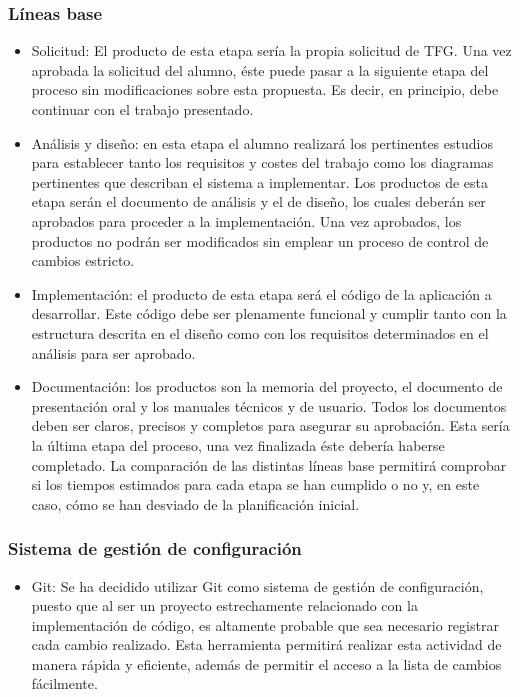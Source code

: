 \documentclass[10pt,a4paper]{article}
\begin{document}
			\subsubsection{Líneas base}
				\begin{itemize}
			    	\item Solicitud: El producto de esta etapa sería la propia solicitud de TFG. Una vez aprobada la solicitud del alumno, éste puede pasar a la siguiente etapa del proceso sin modificaciones sobre esta propuesta. Es decir, en principio, debe continuar con el trabajo presentado.
			    	\item Análisis y diseño: en esta etapa el alumno realizará los pertinentes estudios para establecer tanto los requisitos y costes del trabajo como los diagramas pertinentes que describan el sistema a implementar. Los productos de esta etapa serán el documento de análisis y el de diseño, los cuales deberán ser aprobados para proceder a la implementación. Una vez aprobados, los productos no podrán ser modificados sin emplear un proceso de control de cambios estricto.
			   	 	\item Implementación: el producto de esta etapa será el código de la aplicación a desarrollar. Este código debe ser plenamente funcional y cumplir tanto con la estructura descrita en el diseño como con los requisitos determinados en el análisis para ser aprobado.
			   		\item Documentación: los productos son la memoria del proyecto, el documento de presentación oral y los manuales técnicos y de usuario. Todos los documentos deben ser claros, precisos y completos para asegurar su aprobación. Esta sería la última etapa del proceso, una vez finalizada éste debería haberse completado. La comparación de las distintas líneas base permitirá comprobar si los tiempos estimados para cada etapa se han cumplido o no y, en este caso, cómo se han desviado de la planificación inicial.	    			    
				\end{itemize}
			\subsubsection{Sistema de gestión de configuración}
			\begin{itemize}
			    \item Git: Se ha decidido utilizar Git como sistema de gestión de configuración, puesto que al ser un proyecto estrechamente relacionado con la implementación de código, es altamente probable que sea necesario registrar cada cambio realizado. Esta herramienta permitirá realizar esta actividad de manera rápida y eficiente, además de permitir el acceso a la lista de cambios fácilmente.
			\end{itemize}
\end{document}
